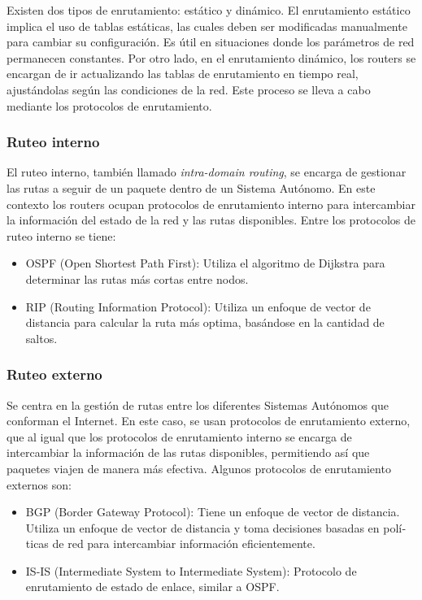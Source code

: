 Existen dos tipos de enrutamiento: estático y dinámico. El enrutamiento estático implica
el uso de tablas estáticas, las cuales deben ser modificadas manualmente para cambiar su
configuración. Es útil en situaciones donde los parámetros de red permanecen constantes.
Por otro lado, en el enrutamiento dinámico, los routers se encargan de ir actualizando las
tablas de enrutamiento en tiempo real, ajustándolas según las condiciones de la red. Este
proceso se lleva a cabo mediante los protocolos de enrutamiento.\\





\subsubsection{Ruteo interno} \label{sec:anexo_ruteo_interno}

El ruteo interno, también llamado \textit{intra-domain routing}, se encarga de gestionar las 
rutas a seguir de un paquete dentro de un Sistema Autónomo.
En este contexto los routers ocupan protocolos de enrutamiento interno para intercambiar la
información del estado de la red y las rutas disponibles. Entre los protocolos de ruteo interno
se tiene:
\begin{itemize}
    \item OSPF (Open Shortest Path First): Utiliza el algoritmo de Dijkstra para determinar las
rutas más cortas entre nodos\cite{RFC-OSPF}.
    \item RIP (Routing Information Protocol): Utiliza un enfoque de vector de distancia para
calcular la ruta más optima, basándose en la cantidad de saltos\cite{RFC-RIP}.
\end{itemize} 


\subsubsection{Ruteo externo} \label{sec:anexo_ruteo_externo}


Se centra en la gestión de rutas entre los diferentes Sistemas Autónomos que conforman
el Internet. En este caso, se usan protocolos de enrutamiento externo, que al igual que los
protocolos de enrutamiento interno se encarga de intercambiar la información de las rutas
disponibles, permitiendo así­ que paquetes viajen de manera más efectiva. Algunos protocolos
de enrutamiento externos son:\\

\begin{itemize}
    \item  BGP (Border Gateway Protocol): Tiene un enfoque de vector de distancia. Utiliza
un enfoque de vector de distancia y toma decisiones basadas en polí­ticas de red para
intercambiar información eficientemente\cite{RFC-BGP}.
    \item IS-IS (Intermediate System to Intermediate System): Protocolo de enrutamiento de
estado de enlace, similar a OSPF\cite{RFC-ISIS}.
\end{itemize} 



